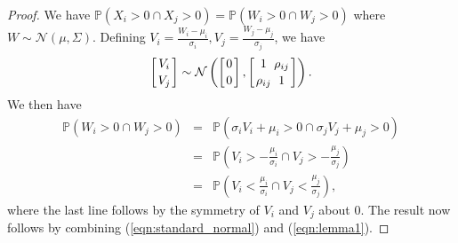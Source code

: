 \documentclass[10pt,a4paper]{amsart}
\begin{document}
\begin{proof}
   
We have $\mathbb{P}(X_i > 0 \cap X_j > 0) = \mathbb{P}(W_i > 0 \cap W_j > 0)$ where $W \sim \mathcal{N}(\mu, \Sigma)$. Defining $V_i = \frac{W_i-\mu_i}{\sigma_i}, V_j = \frac{W_j-\mu_j}{\sigma_j}$, we have
\begin{equation}\label{eqn:standard_normal}\left[ {V_i \atop V_j} \right] \sim \mathcal{N} \left( \left[ {0 \atop 0} \right], \left[ {1 \atop \rho_{ij}} {\rho_{ij} \atop 1} \right] \right).\end{equation}
We then have
\begin{eqnarray}\mathbb{P}(W_i > 0 \cap W_j > 0) &=& \mathbb{P}(\sigma_i V_i + \mu_i > 0 \cap \sigma_j V_j + \mu_j > 0)\nonumber\\&=& \mathbb{P} \left( V_i > - \frac{\mu_i}{\sigma_i} \cap V_j > - \frac{\mu_j}{\sigma_j} \right)\nonumber\\&=&\mathbb{P} \left( V_i < \frac{\mu_i}{\sigma_i} \cap V_j < \frac{\mu_j}{\sigma_j} \right),\label{eqn:lemma1}\end{eqnarray}
where the last line follows by the symmetry of $V_i$ and $V_j$ about $0$. The result now follows by combining (\ref{eqn:standard_normal}) and (\ref{eqn:lemma1}).
    
\end{proof}
\end{document}
